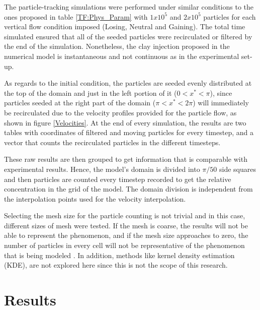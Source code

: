 \documentclass[draft,linenumbers]{agujournal2018}
\begin{document}
The particle-tracking simulations were performed under similar conditions to the ones proposed in table \ref{TF:Phys_Param} with $1x10^5$ and $2x10^5$ particles for each vertical flow condition imposed (Losing, Neutral and Gaining). The total time simulated ensured that all of the seeded particles were recirculated or filtered by the end of the simulation. Nonetheless, the clay injection proposed in the numerical model is instantaneous and not continuous as in the experimental set-up. 

As regards to the initial condition, the particles are seeded evenly distributed at the top of the domain and just in the left portion of it ($0 < x^* < \pi$), since particles seeded at the right part of the domain ($\pi < x^* < 2\pi$) will immediately be recirculated due to the velocity profiles provided for the particle flow, as shown in figure \ref{Velocities}. At the end of every simulation, the results are two tables with coordinates of filtered and moving particles for every timestep, and a vector that counts the recirculated particles in the different timesteps. 

These raw results are then grouped to get information that is comparable with experimental results. Hence, the model's domain is divided into $\pi / 50$ side squares and then particles are counted every timestep recorded to get the relative concentration in the grid of the model. The domain division is independent from the interpolation points used for the velocity interpolation.

Selecting the mesh size for the particle counting is not trivial and in this case, different sizes of mesh were tested. If the mesh is coarse, the results will not be able to represent the phenomenon, and if the mesh size approaches to zero, the number of particles in every cell will not be representative of the phenomenon that is being modeled \citep{Xue2017}. In addition, methods like kernel density estimation (KDE), are not explored here since this is not the scope of this research. 

\section{Results}  \label{Results}
\end{document}
